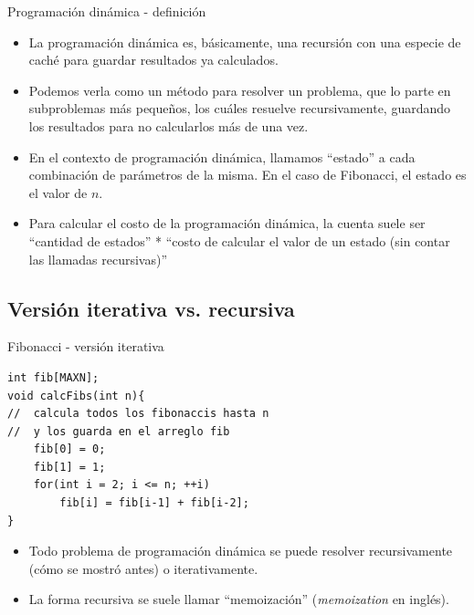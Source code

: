 \documentclass{beamer}
\begin{document}
\begin{frame}{Programaci\'on din\'amica - definici\'on}
\begin{itemize}
\item
La programaci\'on din\'amica es, b\'asicamente, una recursi\'on con una especie de cach\'e para guardar resultados ya calculados.
\item
Podemos verla como un m\'etodo para resolver un problema, que lo parte en subproblemas m\'as peque\~nos, los cu\'ales resuelve recursivamente, guardando los resultados para no calcularlos m\'as de una vez.
\item
En el contexto de programaci\'on din\'amica, llamamos ``estado'' a cada combinaci\'on de par\'ametros de la misma. En el caso de Fibonacci, el estado es el valor de $n$.
\item
Para calcular el costo de la programaci\'on din\'amica, la cuenta suele ser ``cantidad de estados'' * ``costo de calcular el valor de un estado (sin contar las llamadas recursivas)''

\end{itemize}
\end{frame}

\subsection{Versi\'on iterativa vs. recursiva}

\begin{frame}[fragile]{Fibonacci - versi\'on iterativa}
\begin{lstlisting}
int fib[MAXN];
void calcFibs(int n){
//	calcula todos los fibonaccis hasta n
//	y los guarda en el arreglo fib
	fib[0] = 0;
	fib[1] = 1;
	for(int i = 2; i <= n; ++i)
		fib[i] = fib[i-1] + fib[i-2];
}
\end{lstlisting}

\begin{itemize}
\item
Todo problema de programaci\'on din\'amica se puede resolver recursivamente (c\'omo se mostr\'o antes) o iterativamente.
\item
La forma recursiva se suele llamar ``memoizaci\'on'' (\textit{memoization} en ingl\'es).
\end{itemize}

\end{frame}
\end{document}
